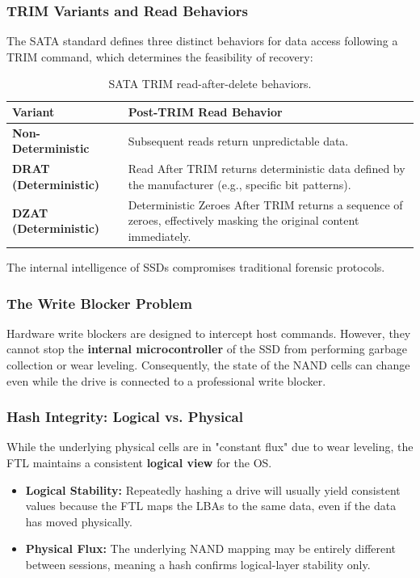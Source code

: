 \subsubsection*{TRIM Variants and Read Behaviors}
The SATA standard defines three distinct behaviors for data access following a TRIM command, which determines the feasibility of recovery:

\begin{table}[H]
\centering
\small
\begin{tabular}{|l|p{8cm}|}
\hline
\textbf{Variant} & \textbf{Post-TRIM Read Behavior} \\
\hline
\textbf{Non-Deterministic} & Subsequent reads return unpredictable data. \\
\hline
\textbf{DRAT (Deterministic)} & Read After TRIM returns deterministic data defined by the manufacturer (e.g., specific bit patterns). \\
\hline
\textbf{DZAT (Deterministic)} & Deterministic Zeroes After TRIM returns a sequence of zeroes, effectively masking the original content immediately. \\
\hline
\end{tabular}
\caption{SATA TRIM read-after-delete behaviors.}
\end{table}

\noindent
The internal intelligence of SSDs compromises traditional forensic protocols.

\subsubsection*{The Write Blocker Problem}
Hardware write blockers are designed to intercept host commands. However, they cannot stop the \textbf{internal microcontroller} of the SSD from performing garbage collection or wear leveling. Consequently, the state of the NAND cells can change even while the drive is connected to a professional write blocker.

\subsubsection*{Hash Integrity: Logical vs. Physical}
While the underlying physical cells are in "constant flux" due to wear leveling, the FTL maintains a consistent \textbf{logical view} for the OS. 
\begin{itemize}
    \item \textbf{Logical Stability:} Repeatedly hashing a drive will usually yield consistent values because the FTL maps the LBAs to the same data, even if the data has moved physically.
    \item \textbf{Physical Flux:} The underlying NAND mapping may be entirely different between sessions, meaning a hash confirms logical-layer stability only.
\end{itemize}

